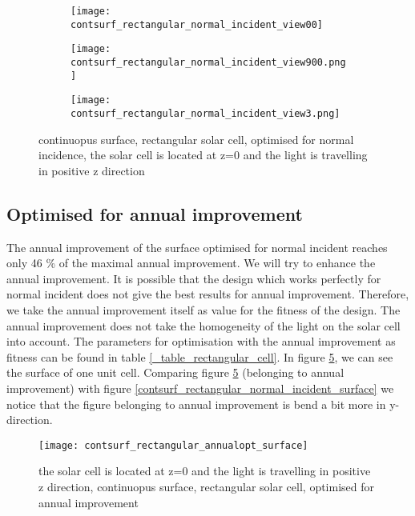 \begin{figure}[h]
\centering
\begin{subfigure}{\textwidth}
\centering
\texttt{[image: contsurf\_rectangular\_normal\_incident\_view00]}
\caption{\label{contsurf_rectangular_normal_incident_view00}}
\end{subfigure}
\begin{subfigure}{\textwidth}
\centering
\texttt{[image: contsurf\_rectangular\_normal\_incident\_view900.png]}
\caption{ \label{contsurf_rectangular_normal_incident_view900}}
\end{subfigure}
\begin{subfigure}{\textwidth}
\centering
\texttt{[image: contsurf\_rectangular\_normal\_incident\_view3.png]}
\caption{ \label{contsurf_rectangular_normal_incident_view3}}
\end{subfigure}
\caption{continuopus surface, rectangular solar cell, optimised for normal incidence, the solar cell is located at z=0 and the light is travelling in positive z direction}
\end{figure}

\clearpage

\subsection{Optimised for annual improvement}

The annual improvement of the surface optimised for normal incident reaches only 46 \% of the maximal annual improvement. We will try to enhance the annual improvement. It is possible that the design which works perfectly for normal incident does not give the best results for annual improvement. Therefore, we take the annual improvement itself as value for the fitness of the design. The annual improvement does not take the homogeneity of the light on the solar cell into account. The parameters for optimisation with the annual improvement as fitness can be found in table \ref{_table_rectangular_cell}. In figure \ref{contsurf_rectangular_annualopt_surface}, we can see the surface of one unit cell. Comparing figure \ref{contsurf_rectangular_annualopt_surface} (belonging to annual improvement) with figure \ref{contsurf_rectangular_normal_incident_surface} we notice that the figure belonging to annual improvement is bend a bit more in y-direction. 

\begin{figure}[h]
\centering
\texttt{[image: contsurf\_rectangular\_annualopt\_surface]}
\caption{the solar cell is located at z=0 and the light is travelling in positive z direction, continuopus surface, rectangular solar cell, optimised for annual improvement\label{contsurf_rectangular_annualopt_surface}}
\end{figure}

